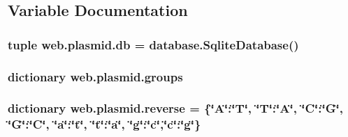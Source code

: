 \subsection{Variable Documentation}
\hypertarget{namespaceweb_1_1plasmid_ad2b82bff33d21eabbac7f05683887542}{
\subsubsection[{db}]{\setlength{\rightskip}{0pt plus 5cm}tuple web.\-plasmid.\-db = {\bf database.\-Sqlite\-Database}()}}\label{namespaceweb_1_1plasmid_ad2b82bff33d21eabbac7f05683887542}
\hypertarget{namespaceweb_1_1plasmid_aafb74ca9719e0596b5c9c71f5f493d9d}{
\subsubsection[{groups}]{\setlength{\rightskip}{0pt plus 5cm}dictionary web.\-plasmid.\-groups}}\label{namespaceweb_1_1plasmid_aafb74ca9719e0596b5c9c71f5f493d9d}
\hypertarget{namespaceweb_1_1plasmid_ac9b01088cbfe70ce3083dc036af63196}{
\subsubsection[{reverse}]{\setlength{\rightskip}{0pt plus 5cm}dictionary web.\-plasmid.\-reverse = \{\char`\"{}A\char`\"{}\-:\char`\"{}T\char`\"{}, \char`\"{}T\char`\"{}\-:\char`\"{}A\char`\"{}, \char`\"{}C\char`\"{}\-:\char`\"{}G\char`\"{}, \char`\"{}G\char`\"{}\-:\char`\"{}C\char`\"{}, \char`\"{}a\char`\"{}\-:\char`\"{}t\char`\"{}, \char`\"{}t\char`\"{}\-:\char`\"{}a\char`\"{}, \char`\"{}g\char`\"{}\-:\char`\"{}c\char`\"{},\char`\"{}c\char`\"{}\-:\char`\"{}g\char`\"{}\}}}\label{namespaceweb_1_1plasmid_ac9b01088cbfe70ce3083dc036af63196}
